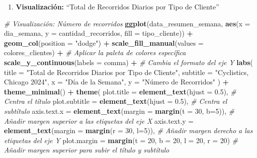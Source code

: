 \documentclass[
]{article}
\newenvironment{Shaded}{\begin{snugshade}}{\end{snugshade}}
\newcommand{\AttributeTok}[1]{\textcolor[rgb]{0.13,0.29,0.53}{#1}}
\newcommand{\CommentTok}[1]{\textcolor[rgb]{0.56,0.35,0.01}{\textit{#1}}}
\newcommand{\DecValTok}[1]{\textcolor[rgb]{0.00,0.00,0.81}{#1}}
\newcommand{\FloatTok}[1]{\textcolor[rgb]{0.00,0.00,0.81}{#1}}
\newcommand{\FunctionTok}[1]{\textcolor[rgb]{0.13,0.29,0.53}{\textbf{#1}}}
\newcommand{\NormalTok}[1]{#1}
\newcommand{\SpecialCharTok}[1]{\textcolor[rgb]{0.81,0.36,0.00}{\textbf{#1}}}
\newcommand{\StringTok}[1]{\textcolor[rgb]{0.31,0.60,0.02}{#1}}
\providecommand{\tightlist}{%
  \setlength{\itemsep}{0pt}\setlength{\parskip}{0pt}}
\begin{document}
\begin{enumerate}
\def\labelenumi{\arabic{enumi}.}
\setcounter{enumi}{1}
\tightlist
\item
  \textbf{Visualización:} ``Total de Recorridos Diarios por Tipo de
  Cliente''
\end{enumerate}

\begin{Shaded}
\begin{Highlighting}[]
\CommentTok{\# Visualización: Número de recorridos}
\FunctionTok{ggplot}\NormalTok{(data\_resumen\_semana, }\FunctionTok{aes}\NormalTok{(}\AttributeTok{x =}\NormalTok{ dia\_semana, }\AttributeTok{y =}\NormalTok{ cantidad\_recorridos, }\AttributeTok{fill =}\NormalTok{ tipo\_cliente)) }\SpecialCharTok{+}
  \FunctionTok{geom\_col}\NormalTok{(}\AttributeTok{position =} \StringTok{"dodge"}\NormalTok{) }\SpecialCharTok{+}
  \FunctionTok{scale\_fill\_manual}\NormalTok{(}\AttributeTok{values =}\NormalTok{ colores\_clientes) }\SpecialCharTok{+} \CommentTok{\# Aplicar la paleta de colores específica}
  \FunctionTok{scale\_y\_continuous}\NormalTok{(}\AttributeTok{labels =}\NormalTok{ comma) }\SpecialCharTok{+} \CommentTok{\# Cambia el formato del eje Y}
  \FunctionTok{labs}\NormalTok{(}
    \AttributeTok{title =} \StringTok{"Total de Recorridos Diarios por Tipo de Cliente"}\NormalTok{,}
    \AttributeTok{subtitle =} \StringTok{"Cyclistics, Chicago 2024"}\NormalTok{,}
    \AttributeTok{x =} \StringTok{"Día de la Semana"}\NormalTok{, }\AttributeTok{y =} \StringTok{"Número de Recorridos"}
\NormalTok{  ) }\SpecialCharTok{+}
  \FunctionTok{theme\_minimal}\NormalTok{() }\SpecialCharTok{+}
  \FunctionTok{theme}\NormalTok{( }
    \AttributeTok{plot.title =} \FunctionTok{element\_text}\NormalTok{(}\AttributeTok{hjust =} \FloatTok{0.5}\NormalTok{), }\CommentTok{\# Centra el título }
    \AttributeTok{plot.subtitle =} \FunctionTok{element\_text}\NormalTok{(}\AttributeTok{hjust =} \FloatTok{0.5}\NormalTok{), }\CommentTok{\# Centra el subtítulo}
    \AttributeTok{axis.text.x =} \FunctionTok{element\_text}\NormalTok{(}\AttributeTok{margin =} \FunctionTok{margin}\NormalTok{(}\AttributeTok{t =} \DecValTok{30}\NormalTok{, }\AttributeTok{b=}\DecValTok{5}\NormalTok{)), }\CommentTok{\# Añadir margen superior a las etiquetas del eje X }
    \AttributeTok{axis.text.y =} \FunctionTok{element\_text}\NormalTok{(}\AttributeTok{margin =} \FunctionTok{margin}\NormalTok{(}\AttributeTok{r =} \DecValTok{30}\NormalTok{, }\AttributeTok{l=}\DecValTok{5}\NormalTok{)), }\CommentTok{\# Añadir margen derecho a las etiquetas del eje Y}
    \AttributeTok{plot.margin =} \FunctionTok{margin}\NormalTok{(}\AttributeTok{t =} \DecValTok{20}\NormalTok{, }\AttributeTok{b =} \DecValTok{20}\NormalTok{, }\AttributeTok{l =} \DecValTok{20}\NormalTok{, }\AttributeTok{r =} \DecValTok{20}\NormalTok{) }\CommentTok{\# Añadir margen superior para subir el título y subtítulo}

\end{Highlighting}
\end{Shaded}
\end{document}
